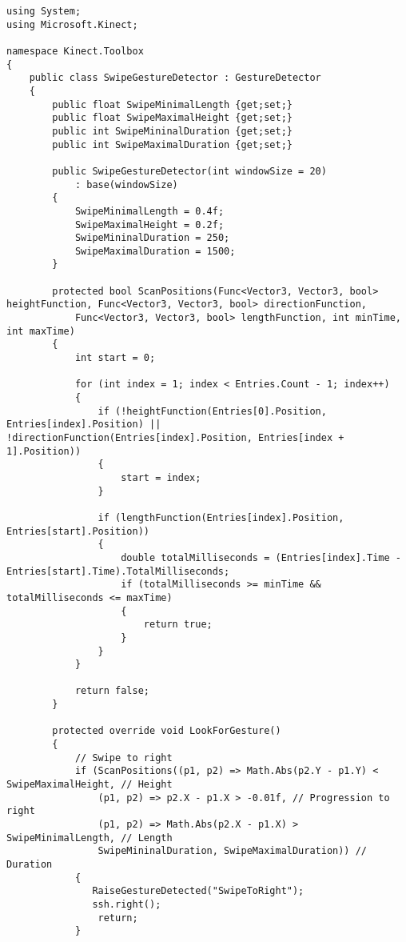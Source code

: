 \begin{lstlisting}
using System;
using Microsoft.Kinect;

namespace Kinect.Toolbox
{
    public class SwipeGestureDetector : GestureDetector
    {
        public float SwipeMinimalLength {get;set;}
        public float SwipeMaximalHeight {get;set;}
        public int SwipeMininalDuration {get;set;}
        public int SwipeMaximalDuration {get;set;}

        public SwipeGestureDetector(int windowSize = 20)
            : base(windowSize)
        {
            SwipeMinimalLength = 0.4f;
            SwipeMaximalHeight = 0.2f;
            SwipeMininalDuration = 250;
            SwipeMaximalDuration = 1500;
        }

        protected bool ScanPositions(Func<Vector3, Vector3, bool> heightFunction, Func<Vector3, Vector3, bool> directionFunction, 
            Func<Vector3, Vector3, bool> lengthFunction, int minTime, int maxTime)
        {
            int start = 0;

            for (int index = 1; index < Entries.Count - 1; index++)
            {
                if (!heightFunction(Entries[0].Position, Entries[index].Position) || !directionFunction(Entries[index].Position, Entries[index + 1].Position))
                {
                    start = index;
                }

                if (lengthFunction(Entries[index].Position, Entries[start].Position))
                {
                    double totalMilliseconds = (Entries[index].Time - Entries[start].Time).TotalMilliseconds;
                    if (totalMilliseconds >= minTime && totalMilliseconds <= maxTime)
                    {
                        return true;
                    }
                }
            }

            return false;
        }

        protected override void LookForGesture()
        {
            // Swipe to right
            if (ScanPositions((p1, p2) => Math.Abs(p2.Y - p1.Y) < SwipeMaximalHeight, // Height
                (p1, p2) => p2.X - p1.X > -0.01f, // Progression to right
                (p1, p2) => Math.Abs(p2.X - p1.X) > SwipeMinimalLength, // Length
                SwipeMininalDuration, SwipeMaximalDuration)) // Duration
            {
               RaiseGestureDetected("SwipeToRight");
               ssh.right();
                return;
            }


\end{lstlisting}
